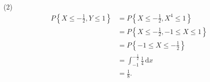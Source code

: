\begin{solution}
$$    $$
    (2)
    $$
        \begin{aligned}
            P\left\{X \leqslant -\frac{1}{2}, Y \leqslant 1\right\}
             & = P\left\{X \leqslant -\frac{1}{2}, X^4 \leqslant 1\right\}            \\
             & = P\left\{X \leqslant -\frac{1}{2}, -1 \leqslant X \leqslant 1\right\} \\
             & = P\left\{-1 \leqslant X \leqslant -\frac{1}{2}\right\}                \\
             & = \int_{-1}^{-\frac{1}{2}} \frac{1}{4} \,\mathrm{d}x                   \\
             & = \frac{1}{8}.                                                         \\
        \end{aligned}
    $$
\end{solution}


